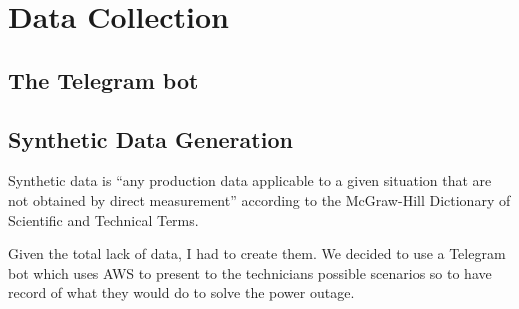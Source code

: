 \chapter{Data Collection}

\section{The Telegram bot}



\section{Synthetic Data Generation}

Synthetic data is ``any production data applicable to a given situation that are not obtained by direct measurement'' according to the McGraw-Hill Dictionary of Scientific and Technical Terms.

Given the total lack of data, I had to create them. We decided to use a Telegram bot which uses AWS to present to the technicians possible scenarios so to have record of what they would do to solve the power outage.